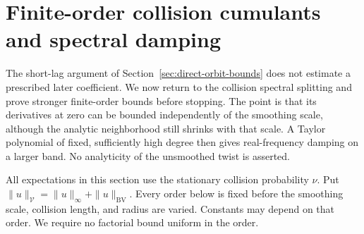 \section{Finite-order collision cumulants and spectral damping}
\label{sec:finite-order-damping}
The short-lag argument of Section~\ref{sec:direct-orbit-bounds} does
not estimate a prescribed later coefficient. We now return to the
collision spectral splitting and prove stronger finite-order bounds
before stopping. The point is that its derivatives at zero can be
bounded independently of the smoothing scale, although the analytic
neighborhood still shrinks with that scale. A Taylor polynomial of
fixed, sufficiently high degree then gives real-frequency damping on
a larger band. No analyticity of the unsmoothed twist is asserted.

All expectations in this section use the stationary collision
probability $\nu$. Put $\|u\|_{\mathcal V}=\|u\|_\infty+
\|u\|_{\mathrm{BV}}$. Every order below is fixed before the smoothing
scale, collision length, and radius are varied. Constants may depend
on that order. We require no factorial bound uniform in the order.

